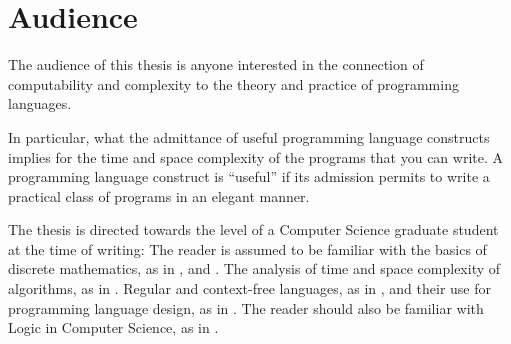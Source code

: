 \section{Audience} \label{sec:introduction:audience}

The audience of this thesis is anyone interested in the connection of
computability and complexity to the theory and practice of programming
languages.

In particular, what the admittance of useful programming language constructs
implies for the time and space complexity of the programs that you can write. A
programming language construct is ``useful'' if its admission permits to write
a practical class of programs in an elegant manner.

The thesis is directed towards the level of a Computer Science graduate student
at the time of writing: The reader is assumed to be familiar with the basics of
discrete mathematics, as in \cite[\ch~0]{sipser-2013}, and \cite[Appendices A,
B, and C]{cormen-et-al-2009}. The analysis of time and space complexity of
algorithms, as in \cite[\chs~1--17 and \chs~21--24]{cormen-et-al-2009}. Regular
and context-free languages, as in \cite[\chs~1--2]{sipser-2013}, and their use
for programming language design, as in \cite{mogensen-2010}. The reader should
also be familiar with Logic in Computer Science, as in
\cite[\chs~1--4]{huth-ryan-2004}.
